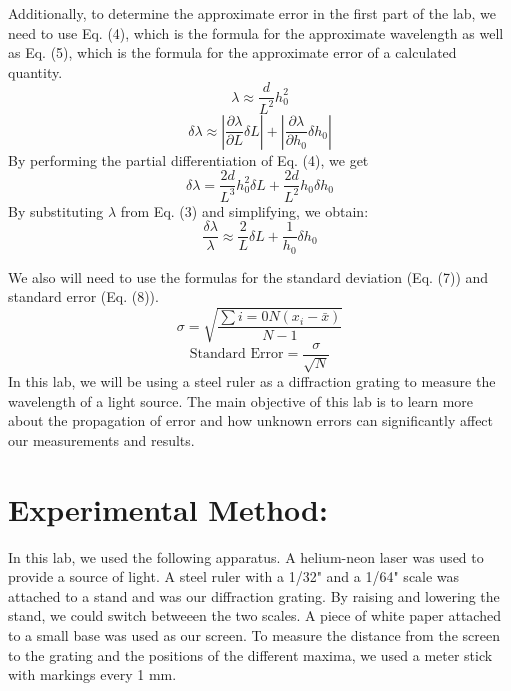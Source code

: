 \documentclass[leqno]{article}
\begin{document}
\noindent Additionally, to determine the approximate error in the first part of the lab, we need to use Eq. (4), which is the formula for the approximate wavelength as well as Eq. (5), which is the formula for the approximate error of a calculated quantity.
\begin{equation}
	\lambda \approx \frac{d}{L^2} h_0^2
\end{equation}
\begin{equation}
	\delta \lambda \approx |\frac{\partial \lambda}{\partial L}\delta L|+ |\frac{\partial\lambda}{\partial h_0}\delta h_0|
\end{equation}
By performing the partial differentiation of Eq. (4), we get
\begin{equation}
	\delta\lambda=\frac{2d}{L^3}h_0^2  \delta L+\frac{2d}{L^2}h_0  \delta h_0
\end{equation}
By substituting $\lambda$ from Eq. (3) and simplifying, we obtain:
\begin{equation}
  \frac{\delta \lambda}{\lambda} \approx \frac{2}{L} \delta L + \frac{1}{h_0} \delta h_0
  \end{equation}
  
We also will need to use the formulas for the standard deviation (Eq. (7)) and standard error (Eq. (8)).
\begin{equation}
	\sigma=\sqrt{\frac{\sum{i=0}{N}{(x_i-\bar{x})}}{N-1}}
\end{equation}
\begin{equation}
	\text{Standard Error}=\frac{\sigma}{\sqrt{N}}
\end{equation}
In this lab, we will be using a steel ruler as a diffraction grating to measure the wavelength of a light source.  The main objective of this lab is to learn more about the propagation of error and how unknown errors can significantly affect our measurements and results.
\section*{Experimental Method:}
In this lab, we used the following apparatus.  A helium-neon laser was used to provide a source of light.  A steel ruler with a 1/32" and a 1/64" scale was attached to a stand and was our diffraction grating.  By raising and lowering the stand, we could switch betweeen the two scales.  A piece of white paper attached to a small base was used as our screen.  To measure the distance from the screen to the grating and the positions of the different maxima, we used a meter stick with markings every 1 mm.\\
\end{document}
